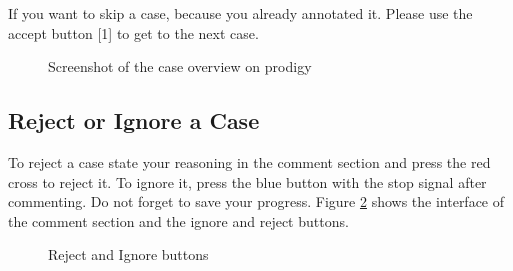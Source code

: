 \documentclass{article}
\begin{document}
If you want to skip a case, because you already annotated it. Please use the accept button [1] to get to the next case.
\pagebreak
\begin{figure}[h]
     \caption{Screenshot of the case overview on prodigy}
     \label{overview}
\end{figure}


\subsection{Reject or Ignore a Case}
\label{reject-ignore-case}
To reject a case state your reasoning in the comment section and press the red cross to reject it. To ignore it, press the blue button with the stop signal after commenting. Do not forget to save your progress. Figure \ref{reject_ignore} shows the interface of the comment section and the ignore and reject buttons. 

\begin{figure}[H]
     \caption{Reject and Ignore buttons}
     \label{reject_ignore}
\end{figure}

\pagebreak
\end{document}
